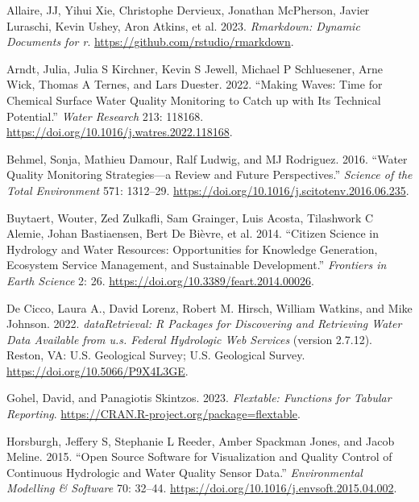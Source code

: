 \hypertarget{refs}{}
\begin{CSLReferences}{1}{0}
\leavevmode{}%
Allaire, JJ, Yihui Xie, Christophe Dervieux, Jonathan McPherson, Javier Luraschi, Kevin Ushey, Aron Atkins, et al. 2023. \emph{Rmarkdown: Dynamic Documents for r}. \url{https://github.com/rstudio/rmarkdown}.

\leavevmode{}%
Arndt, Julia, Julia S Kirchner, Kevin S Jewell, Michael P Schluesener, Arne Wick, Thomas A Ternes, and Lars Duester. 2022. {``Making Waves: Time for Chemical Surface Water Quality Monitoring to Catch up with Its Technical Potential.''} \emph{Water Research} 213: 118168. \url{https://doi.org/10.1016/j.watres.2022.118168}.

\leavevmode{}%
Behmel, Sonja, Mathieu Damour, Ralf Ludwig, and MJ Rodriguez. 2016. {``Water Quality Monitoring Strategies---a Review and Future Perspectives.''} \emph{Science of the Total Environment} 571: 1312--29. \url{https://doi.org/10.1016/j.scitotenv.2016.06.235}.

\leavevmode{}%
Buytaert, Wouter, Zed Zulkafli, Sam Grainger, Luis Acosta, Tilashwork C Alemie, Johan Bastiaensen, Bert De Bièvre, et al. 2014. {``Citizen Science in Hydrology and Water Resources: Opportunities for Knowledge Generation, Ecosystem Service Management, and Sustainable Development.''} \emph{Frontiers in Earth Science} 2: 26. \url{https://doi.org/10.3389/feart.2014.00026}.

\leavevmode{}%
De Cicco, Laura A., David Lorenz, Robert M. Hirsch, William Watkins, and Mike Johnson. 2022. \emph{dataRetrieval: R Packages for Discovering and Retrieving Water Data Available from u.s. Federal Hydrologic Web Services} (version 2.7.12). Reston, VA: U.S. Geological Survey; U.S. Geological Survey. \url{https://doi.org/10.5066/P9X4L3GE}.

\leavevmode{}%
Gohel, David, and Panagiotis Skintzos. 2023. \emph{Flextable: Functions for Tabular Reporting}. \url{https://CRAN.R-project.org/package=flextable}.

\leavevmode{}%
Horsburgh, Jeffery S, Stephanie L Reeder, Amber Spackman Jones, and Jacob Meline. 2015. {``Open Source Software for Visualization and Quality Control of Continuous Hydrologic and Water Quality Sensor Data.''} \emph{Environmental Modelling \& Software} 70: 32--44. \url{https://doi.org/10.1016/j.envsoft.2015.04.002}.


\end{CSLReferences}

